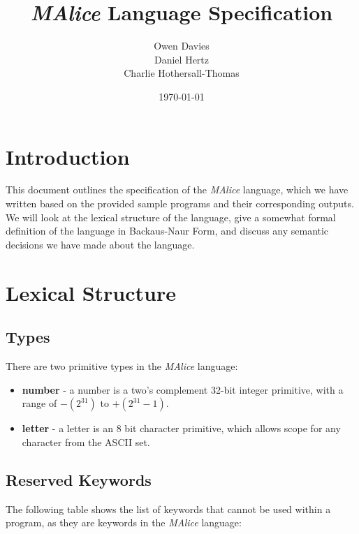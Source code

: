 \documentclass[a4, 11pt]{article}
\begin{document}
\title{\huge{\emph{MAlice} Language Specification}}
\author{Owen Davies\\Daniel Hertz\\Charlie Hothersall-Thomas}
\date{\today}

\maketitle

\section*{Introduction}
This document outlines the specification of the \emph{MAlice} language, which we have written based on the provided sample programs and their corresponding outputs. We will look at the lexical structure of the language, give a somewhat formal definition of the language in Backaus-Naur Form, and discuss any semantic decisions we have made about the language.

\section*{Lexical Structure}
\subsection*{Types}
There are two primitive types in the \emph{MAlice} language:

\begin{itemize}
  \item \textbf{number} - a number is a two's complement 32-bit integer 
  primitive, with a range of \( -(2^{31}) \) to \( +(2^{31} - 1) \). 
  \item \textbf{letter} - a letter is an 8 bit character primitive, which 
  allows scope for any character from the ASCII set.
\end{itemize}

\subsection*{Reserved Keywords}
The following table shows the list of keywords that cannot be used within a program, as they are keywords in the \emph{MAlice} language:
\end{document}
